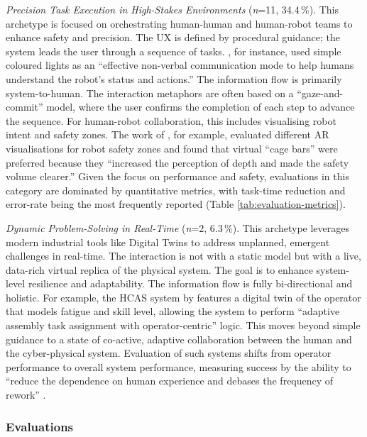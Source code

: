 \emph{Precision Task Execution in High-Stakes Environments} (\textit{n}=11, 34.4\,\%).  
This archetype is focused on orchestrating human-human and human-robot teams to enhance safety and precision. The UX is defined by procedural guidance; the system leads the user through a sequence of tasks. \cite{deFranco2019intuitive}, for instance, used simple coloured lights as an ``effective non-verbal communication mode to help humans understand the robot's status and actions.'' The information flow is primarily system-to-human. The interaction metaphors are often based on a ``gaze-and-commit'' model, where the user confirms the completion of each step to advance the sequence. For human-robot collaboration, this includes visualising robot intent and safety zones. The work of \cite{cogurcu2023comparative}, for example, evaluated different AR visualisations for robot safety zones and found that virtual ``cage bars'' were preferred because they ``increased the perception of depth and made the safety volume clearer.'' Given the focus on performance and safety, evaluations in this category are dominated by quantitative metrics, with task-time reduction and error-rate being the most frequently reported (Table \ref{tab:evaluation-metrics}).

\emph{Dynamic Problem-Solving in Real-Time} (\textit{n}=2, 6.3\,\%).  
This archetype leverages modern industrial tools like Digital Twins to address unplanned, emergent challenges in real-time. The interaction is not with a static model but with a live, data-rich virtual replica of the physical system. The goal is to enhance system-level resilience and adaptability. The information flow is fully bi-directional and holistic. For example, the HCAS system by \cite{liu2022humanCentric} features a digital twin of the operator that models fatigue and skill level, allowing the system to perform ``adaptive assembly task assignment with operator-centric'' logic. This moves beyond simple guidance to a state of co-active, adaptive collaboration between the human and the cyber-physical system. Evaluation of such systems shifts from operator performance to overall system performance, measuring success by the ability to ``reduce the dependence on human experience and debases the frequency of rework'' \cite{liu2022humanCentric}.


\subsubsection{Evaluations}
\label{sec:lit-evaluations}

